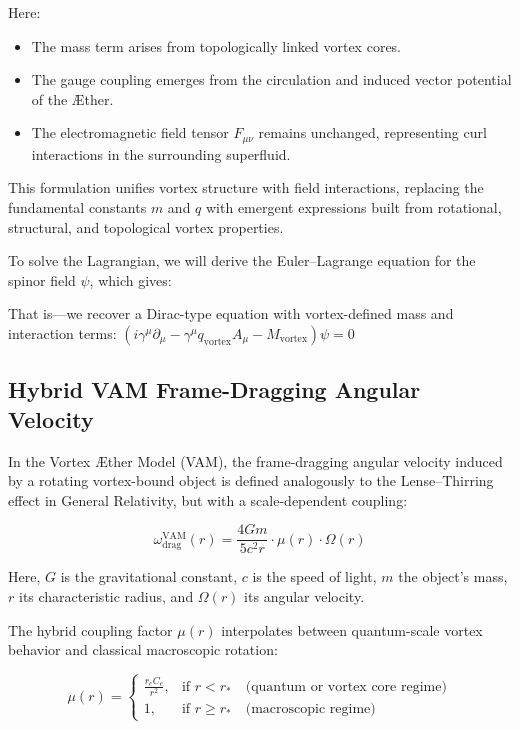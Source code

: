 Here:
\begin{itemize}
\item The mass term arises from topologically linked vortex cores.
\item The gauge coupling emerges from the circulation and induced vector potential of the \AE ther.
\item The electromagnetic field tensor \( F_{\mu\nu} \) remains unchanged, representing curl interactions in the surrounding superfluid.
\end{itemize}
This formulation unifies vortex structure with field interactions, replacing the fundamental constants \( m \) and \( q \) with emergent expressions built from rotational, structural, and topological vortex properties.

To solve the Lagrangian, we will derive the Euler--Lagrange equation for the spinor field \( \psi \), which gives:

That is—we recover a Dirac-type equation with vortex-defined mass and interaction terms:
$ \boxed{
    \left( i \gamma^\mu \partial_\mu - \gamma^\mu q_{\text{vortex}} A_\mu - M_{\text{vortex}} \right)\psi = 0
} $

\subsection*{Hybrid VAM Frame-Dragging Angular Velocity}

In the Vortex Æther Model (VAM), the frame-dragging angular velocity induced by a rotating vortex-bound object is defined analogously to the Lense--Thirring effect in General Relativity, but with a scale-dependent coupling:

\begin{equation}
    \omega_{\text{drag}}^{\text{VAM}}(r) =
    \frac{4 G m}{5 c^2 r} \cdot \mu(r) \cdot \Omega(r)
\end{equation}

Here, \( G \) is the gravitational constant, \( c \) is the speed of light, \( m \) the object's mass, \( r \) its characteristic radius, and \( \Omega(r) \) its angular velocity.

The hybrid coupling factor \( \mu(r) \) interpolates between quantum-scale vortex behavior and classical macroscopic rotation:

\begin{equation}
    \mu(r) =
    \begin{cases}
        \displaystyle \frac{r_c C_e}{r^2}, & \text{if } r < r_\ast \quad \text{(quantum or vortex core regime)} \\
        1, & \text{if } r \geq r_\ast \quad \text{(macroscopic regime)}
    \end{cases}
\end{equation}

